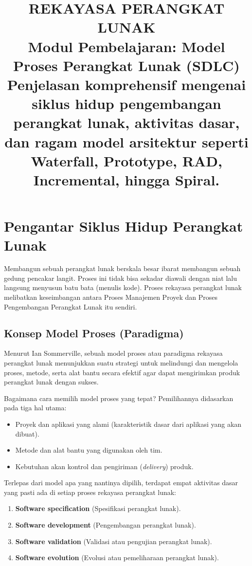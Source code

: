 \documentclass[12pt,a4paper]{article}
\title{
  {\LARGE\bfseries REKAYASA PERANGKAT LUNAK}\\[0.5em]
  {\large Modul Pembelajaran: Model Proses Perangkat Lunak (SDLC)}\\[0.8em]
  {\normalsize Penjelasan komprehensif mengenai siklus hidup pengembangan perangkat lunak, aktivitas dasar, dan ragam model arsitektur seperti Waterfall, Prototype, RAD, Incremental, hingga Spiral.}
}
\author{}
\date{}
\begin{document}
\maketitle
\thispagestyle{fancy}
\tableofcontents
\newpage


\section{Pengantar Siklus Hidup Perangkat Lunak}

Membangun sebuah perangkat lunak berskala besar ibarat membangun sebuah gedung pencakar langit. Proses ini tidak bisa sekadar diawali dengan niat lalu langsung menyusun batu bata (menulis kode). Proses rekayasa perangkat lunak melibatkan keseimbangan antara Proses Manajemen Proyek dan Proses Pengembangan Perangkat Lunak itu sendiri.

\subsection{Konsep Model Proses (Paradigma)}
Menurut Ian Sommerville, sebuah model proses atau paradigma rekayasa perangkat lunak menunjukkan suatu strategi untuk melindungi dan mengelola proses, metode, serta alat bantu secara efektif agar dapat mengirimkan produk perangkat lunak dengan sukses. 

Bagaimana cara memilih model proses yang tepat? Pemilihannya didasarkan pada tiga hal utama:
\begin{itemize}
    \item Proyek dan aplikasi yang alami (karakteristik dasar dari aplikasi yang akan dibuat).
    \item Metode dan alat bantu yang digunakan oleh tim.
    \item Kebutuhan akan kontrol dan pengiriman (\textit{delivery}) produk.
\end{itemize}

Terlepas dari model apa yang nantinya dipilih, terdapat empat aktivitas dasar yang pasti ada di setiap proses rekayasa perangkat lunak:
\begin{enumerate}
    \item \textbf{Software specification} (Spesifikasi perangkat lunak).
    \item \textbf{Software development} (Pengembangan perangkat lunak).
    \item \textbf{Software validation} (Validasi atau pengujian perangkat lunak).
    \item \textbf{Software evolution} (Evolusi atau pemeliharaan perangkat lunak).
\end{enumerate}
\end{document}
